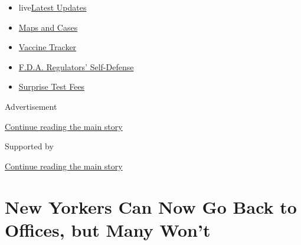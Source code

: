 \begin{itemize}
\tightlist
\item
  live\href{https://www.nytimes3xbfgragh.onion/2020/09/11/world/covid-19-coronavirus.html?name=styln-coronavirus-national\&region=TOP_BANNER\&block=storyline_menu_recirc\&action=click\&pgtype=Article\&impression_id=3caed8f1-f4d3-11ea-b483-2d6765c32891\&variant=undefined}{Latest
  Updates}
\item
  \href{https://www.nytimes3xbfgragh.onion/interactive/2020/us/coronavirus-us-cases.html?name=styln-coronavirus-national\&region=TOP_BANNER\&block=storyline_menu_recirc\&action=click\&pgtype=Article\&impression_id=3caed8f2-f4d3-11ea-b483-2d6765c32891\&variant=undefined}{Maps
  and Cases}
\item
  \href{https://www.nytimes3xbfgragh.onion/interactive/2020/science/coronavirus-vaccine-tracker.html?name=styln-coronavirus-national\&region=TOP_BANNER\&block=storyline_menu_recirc\&action=click\&pgtype=Article\&impression_id=3caf0000-f4d3-11ea-b483-2d6765c32891\&variant=undefined}{Vaccine
  Tracker}
\item
  \href{https://www.nytimes3xbfgragh.onion/2020/09/10/us/politics/fda-coronavirus-vaccine.html?name=styln-coronavirus-national\&region=TOP_BANNER\&block=storyline_menu_recirc\&action=click\&pgtype=Article\&impression_id=3caf0001-f4d3-11ea-b483-2d6765c32891\&variant=undefined}{F.D.A.
  Regulators' Self-Defense}
\item
  \href{https://www.nytimes3xbfgragh.onion/2020/09/09/upshot/coronavirus-surprise-test-fees.html?name=styln-coronavirus-national\&region=TOP_BANNER\&block=storyline_menu_recirc\&action=click\&pgtype=Article\&impression_id=3caf0002-f4d3-11ea-b483-2d6765c32891\&variant=undefined}{Surprise
  Test Fees}
\end{itemize}

Advertisement

\protect\hyperlink{after-top}{Continue reading the main story}

Supported by

\protect\hyperlink{after-sponsor}{Continue reading the main story}

\hypertarget{new-yorkers-can-now-go-back-to-offices-but-many-wont}{%
\section{New Yorkers Can Now Go Back to Offices, but Many
Won't}\label{new-yorkers-can-now-go-back-to-offices-but-many-wont}}

